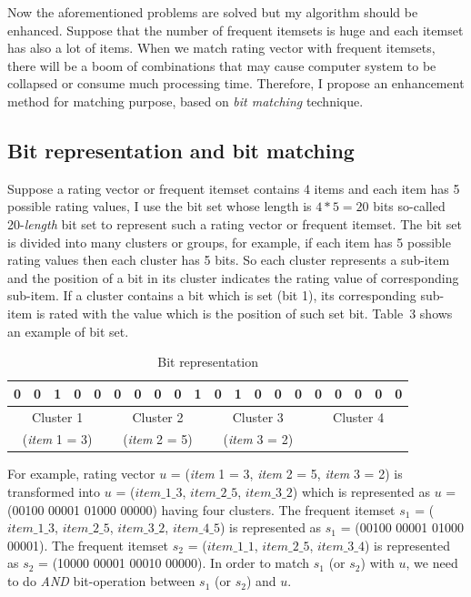 \documentclass{article}
\begin{document}
Now the aforementioned problems are solved but my algorithm should be enhanced. Suppose that the number of frequent itemsets is huge and each itemset has also a lot of items. When we match rating vector with frequent itemsets, there will be a boom of combinations that may cause computer system to be collapsed or consume much processing time. Therefore, I propose an enhancement method for matching purpose, based on \textit{bit matching} technique.

\subsection{Bit representation and bit matching}
Suppose a rating vector or frequent itemset contains 4 items and each item has 5 possible rating values, I use the bit set whose length is $4 * 5 = 20$ bits so-called 20-\textit{length} bit set to represent such a rating vector or frequent itemset. The bit set is divided into many clusters or groups, for example, if each item has 5 possible rating values then each cluster has 5 bits. So each cluster represents a sub-item and the position of a bit in its cluster indicates the rating value of corresponding sub-item. If a cluster contains a bit which is set (bit 1), its corresponding sub-item is rated with the value which is the position of such set bit. Table~3 shows an example of bit set.
\begin{table} \label{table:bit.representation}
\setlength{\tabcolsep}{3.5pt}
\centering
\caption{Bit representation}
\begin{tabular}{|c|c|c|c|c|c|c|c|c|c|c|c|c|c|c|c|c|c|c|c|} \hline
0&0&1&0&0&0&0&0&0&1&0&1&0&0&0&0&0&0&0&0\\ \hline
\multicolumn{5}{|c|}{Cluster 1}&\multicolumn{5}{|c|}{Cluster 2}&\multicolumn{5}{|c|}{Cluster 3}&\multicolumn{5}{|c|}{Cluster 4}\\
\multicolumn{5}{|c|}{(\textit{item} 1 = 3)}&\multicolumn{5}{|c|}{(\textit{item} 2 = 5)}&\multicolumn{5}{|c|}{(\textit{item} 3 = 2)}&\multicolumn{5}{|c|}{}\\ \hline
\end{tabular}
\end{table}
For example, rating vector $u$ = (\textit{item} 1 = 3, \textit{item} 2 = 5, \textit{item} 3 = 2) is transformed into $u$ = ($item\_1\_3$, $item\_2\_5$, $item\_3\_2$) which is represented as $u$ = (00100 00001 01000 00000) having four clusters. The frequent itemset $s_1$ = ($item\_1\_3$, $item\_2\_5$, $item\_3\_2$, $item\_4\_5$) is represented as $s_1$ = (00100 00001 01000 00001). The frequent itemset $s_2$ = ($item\_1\_1$, $item\_2\_5$, $item\_3\_4$) is represented as $s_2$ = (10000 00001 00010 00000). In order to match $s_1$ (or $s_2$) with $u$, we need to do \textit{AND} bit-operation between $s_1$ (or $s_2$) and $u$.
\end{document}
